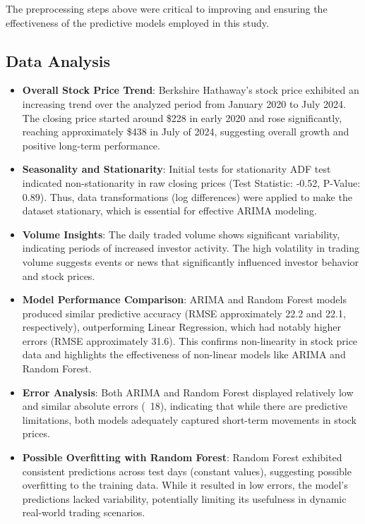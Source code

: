 \documentclass[conference]{IEEEtran}
\begin{document}
The preprocessing steps above were critical to improving and ensuring the effectiveness of the predictive models employed in this study.

\subsection{Data Analysis}\label{AA}
\begin{itemize}
    \item \textbf{Overall Stock Price Trend}: Berkshire Hathaway's stock price exhibited an increasing trend over the analyzed period from January 2020 to July 2024. The closing price started around \$228 in early 2020 and rose significantly, reaching approximately \$438 in July of 2024, suggesting overall growth and positive long-term performance.
    \item \textbf{Seasonality and Stationarity}: Initial tests for stationarity ADF test indicated non-stationarity in raw closing prices (Test Statistic: -0.52, P-Value: 0.89). Thus, data transformations (log differences) were applied to make the dataset stationary, which is essential for effective ARIMA modeling.
    \item \textbf{Volume Insights}: The daily traded volume shows significant variability, indicating periods of increased investor activity. The high volatility in trading volume suggests events or news that significantly influenced investor behavior and stock prices.
    \item \textbf{Model Performance Comparison}: ARIMA and Random Forest models produced similar predictive accuracy (RMSE approximately 22.2 and 22.1, respectively), outperforming Linear Regression, which had notably higher errors (RMSE approximately 31.6). This confirms non-linearity in stock price data and highlights the effectiveness of non-linear models like ARIMA and Random Forest.
    \item \textbf{Error Analysis}: Both ARIMA and Random Forest displayed relatively low and similar absolute errors (~18), indicating that while there are predictive limitations, both models adequately captured short-term movements in stock prices.
    \item \textbf{Possible Overfitting with Random Forest}: Random Forest exhibited consistent predictions across test days (constant values), suggesting possible overfitting to the training data. While it resulted in low errors, the model’s predictions lacked variability, potentially limiting its usefulness in dynamic real-world trading scenarios.
\end{itemize}
\end{document}
